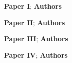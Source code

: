 
\textbf{Paper I}; \textbf{Authors}\\
\lipsum[66]

\textbf{Paper II}; \textbf{Authors}\\
\lipsum[1]

\textbf{Paper III}; \textbf{Authors}\\
\lipsum[10]

\textbf{Paper IV}; \textbf{Authors}\\
\lipsum[75]